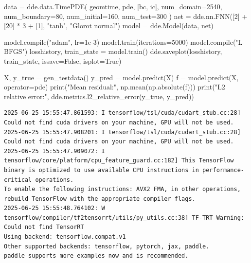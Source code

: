 \documentclass[
  spanish,
  us-letterpaper,
  DIV=11,
  numbers=noendperiod]{scrreprt}
\newenvironment{Shaded}{\begin{snugshade}}{\end{snugshade}}
\newcommand{\BuiltInTok}[1]{\textcolor[rgb]{0.00,0.23,0.31}{#1}}
\newcommand{\DecValTok}[1]{\textcolor[rgb]{0.68,0.00,0.00}{#1}}
\newcommand{\FloatTok}[1]{\textcolor[rgb]{0.68,0.00,0.00}{#1}}
\newcommand{\NormalTok}[1]{\textcolor[rgb]{0.00,0.23,0.31}{#1}}
\newcommand{\OperatorTok}[1]{\textcolor[rgb]{0.37,0.37,0.37}{#1}}
\newcommand{\StringTok}[1]{\textcolor[rgb]{0.13,0.47,0.30}{#1}}
\newcommand{\VariableTok}[1]{\textcolor[rgb]{0.07,0.07,0.07}{#1}}
\theoremstyle{plain}
\theoremstyle{definition}
\theoremstyle{remark}
\begin{document}
\begin{Shaded}
\begin{Highlighting}[]
\NormalTok{data }\OperatorTok{=}\NormalTok{ dde.data.TimePDE(}
\NormalTok{    geomtime, pde, [bc, ic],}
\NormalTok{    num\_domain}\OperatorTok{=}\DecValTok{2540}\NormalTok{,}
\NormalTok{    num\_boundary}\OperatorTok{=}\DecValTok{80}\NormalTok{,}
\NormalTok{    num\_initial}\OperatorTok{=}\DecValTok{160}\NormalTok{,}
\NormalTok{    num\_test}\OperatorTok{=}\DecValTok{300}
\NormalTok{)}
\NormalTok{net }\OperatorTok{=}\NormalTok{ dde.nn.FNN([}\DecValTok{2}\NormalTok{] }\OperatorTok{+}\NormalTok{ [}\DecValTok{20}\NormalTok{] }\OperatorTok{*} \DecValTok{3} \OperatorTok{+}\NormalTok{ [}\DecValTok{1}\NormalTok{], }\StringTok{"tanh"}\NormalTok{, }\StringTok{"Glorot normal"}\NormalTok{)}
\NormalTok{model }\OperatorTok{=}\NormalTok{ dde.Model(data, net)}

\NormalTok{model.}\BuiltInTok{compile}\NormalTok{(}\StringTok{"adam"}\NormalTok{, lr}\OperatorTok{=}\FloatTok{1e{-}3}\NormalTok{)}
\NormalTok{model.train(iterations}\OperatorTok{=}\DecValTok{5000}\NormalTok{)}
\NormalTok{model.}\BuiltInTok{compile}\NormalTok{(}\StringTok{"L{-}BFGS"}\NormalTok{)}
\NormalTok{losshistory, train\_state }\OperatorTok{=}\NormalTok{ model.train()}
\NormalTok{dde.saveplot(losshistory, train\_state, issave}\OperatorTok{=}\VariableTok{False}\NormalTok{, isplot}\OperatorTok{=}\VariableTok{True}\NormalTok{)}

\NormalTok{X, y\_true }\OperatorTok{=}\NormalTok{ gen\_testdata()}
\NormalTok{y\_pred }\OperatorTok{=}\NormalTok{ model.predict(X)}
\NormalTok{f }\OperatorTok{=}\NormalTok{ model.predict(X, operator}\OperatorTok{=}\NormalTok{pde)}
\BuiltInTok{print}\NormalTok{(}\StringTok{"Mean residual:"}\NormalTok{, np.mean(np.absolute(f)))}
\BuiltInTok{print}\NormalTok{(}\StringTok{"L2 relative error:"}\NormalTok{, dde.metrics.l2\_relative\_error(y\_true, y\_pred))}
\end{Highlighting}
\end{Shaded}

\begin{verbatim}
2025-06-25 15:55:47.861593: I tensorflow/tsl/cuda/cudart_stub.cc:28] Could not find cuda drivers on your machine, GPU will not be used.
2025-06-25 15:55:47.908201: I tensorflow/tsl/cuda/cudart_stub.cc:28] Could not find cuda drivers on your machine, GPU will not be used.
2025-06-25 15:55:47.909072: I tensorflow/core/platform/cpu_feature_guard.cc:182] This TensorFlow binary is optimized to use available CPU instructions in performance-critical operations.
To enable the following instructions: AVX2 FMA, in other operations, rebuild TensorFlow with the appropriate compiler flags.
2025-06-25 15:55:48.764102: W tensorflow/compiler/tf2tensorrt/utils/py_utils.cc:38] TF-TRT Warning: Could not find TensorRT
Using backend: tensorflow.compat.v1
Other supported backends: tensorflow, pytorch, jax, paddle.
paddle supports more examples now and is recommended.
\end{verbatim}
\end{document}
